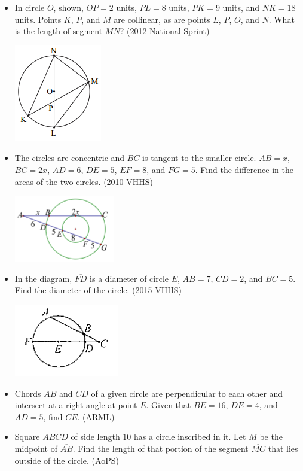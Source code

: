 \documentclass{article}
\begin{document}
\begin{itemize}

\item In circle $O$, shown, $OP=2$ units, $PL=8$ units, $PK=9$ units, and $NK=18$ units. Points $K$, $P$, and $M$ are collinear, as are points $L$, $P$, $O$, and $N$. What is the length of segment $MN$? (2012 National Sprint)

\centerline{\includegraphics{201222.png}}

\item The circles are concentric and $\overline{BC}$ is tangent to the smaller circle. $AB=x$, $BC=2x$, $AD=6$, $DE=5$, $EF=8$, and $FG=5$. Find the difference in the areas of the two circles. (2010 VHHS)

\centerline{\includegraphics{VHHS20108.PNG}}

\item In the diagram, $\overline{FD}$ is a diameter of circle $E$, $AB=7$, $CD=2$, and $BC=5$. Find the diameter of the circle. (2015 VHHS)

\centerline{\includegraphics{2015VHHS.png}}

\item Chords $AB$ and $CD$ of a given circle are perpendicular to each other and intersect at a right angle at point $E$. Given that $BE=16$, $DE=4$, and $AD=5$, find $CE$. (ARML)

\item Square $ABCD$ of side length $10$ has a circle inscribed in it. Let $M$ be the midpoint of $\overline{AB}.$ Find the length of that portion of the segment $\overline{MC}$ that lies outside of the circle. (AoPS)


\end{itemize}
\end{document}
